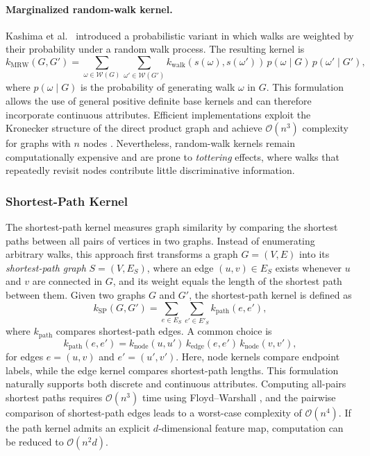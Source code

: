 \paragraph{Marginalized random-walk kernel.}
Kashima et al.~\citep{kashima2003marginalized}
introduced a probabilistic variant in which walks are
weighted by their probability under a random walk process.
The resulting kernel is
\[
k_{\mathrm{MRW}}(G,G')
=
\sum_{\omega \in \mathcal{W}(G)}
\sum_{\omega' \in \mathcal{W}(G')}
k_{\mathrm{walk}}(s(\omega), s(\omega'))
\, p(\omega \mid G)\,
p(\omega' \mid G'),
\]
where $p(\omega \mid G)$ is the probability of generating
walk $\omega$ in $G$.
This formulation allows the use of general positive definite
base kernels and can therefore incorporate continuous attributes.
Efficient implementations exploit the Kronecker structure of
the direct product graph and achieve
$\mathcal{O}(n^3)$ complexity for graphs with $n$ nodes
\citep{vishwanathan2010graph}.
Nevertheless, random-walk kernels remain computationally
expensive and are prone to \emph{tottering} effects,
where walks that repeatedly revisit nodes contribute little
discriminative information.
\subsubsection{Shortest-Path Kernel}
\label{sec:theory:sp_kernel}

The shortest-path kernel \citep{borgwardt2005shortest}
measures graph similarity by comparing the shortest paths
between all pairs of vertices in two graphs.
Instead of enumerating arbitrary walks, this approach first
transforms a graph $G=(V,E)$ into its \emph{shortest-path graph}
$S=(V,E_S)$, where an edge $(u,v)\in E_S$ exists whenever
$u$ and $v$ are connected in $G$, and its weight equals the
length of the shortest path between them.
Given two graphs $G$ and $G'$, the shortest-path kernel is defined as
\[
k_{\mathrm{SP}}(G,G')
=
\sum_{e \in E_S}
\sum_{e' \in E'_S}
k_{\mathrm{path}}(e,e'),
\]
where $k_{\mathrm{path}}$ compares shortest-path edges.
A common choice is
\[
k_{\mathrm{path}}(e,e')
=
k_{\mathrm{node}}(u,u')
\, k_{\mathrm{edge}}(e,e')
\, k_{\mathrm{node}}(v,v'),
\]
for edges $e=(u,v)$ and $e'=(u',v')$.
Here, node kernels compare endpoint labels,
while the edge kernel compares shortest-path lengths.
This formulation naturally supports both discrete
and continuous attributes.
Computing all-pairs shortest paths requires
$\mathcal{O}(n^3)$ time using Floyd–Warshall \citep{cormen2009introduction},
and the pairwise comparison of shortest-path edges
leads to a worst-case complexity of $\mathcal{O}(n^4)$.
If the path kernel admits an explicit $d$-dimensional
feature map, computation can be reduced to
$\mathcal{O}(n^2 d)$.
